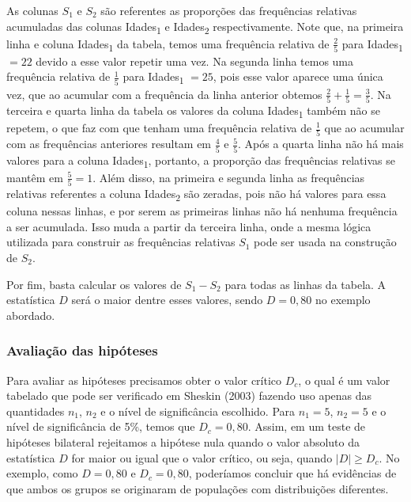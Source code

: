 \documentclass[
  letterpaper,
  DIV=11,
  numbers=noendperiod]{scrreprt}
\begin{document}
As colunas \(S_1\) e \(S_2\) são referentes as proporções das
frequências relativas acumuladas das colunas Idades\textsubscript{1} e
Idades\textsubscript{2} respectivamente. Note que, na primeira linha e
coluna Idades\textsubscript{1} da tabela, temos uma frequência relativa
de \(\displaystyle \frac{2}{5}\) para Idades\textsubscript{1} \(= 22\)
devido a esse valor repetir uma vez. Na segunda linha temos uma
frequência relativa de \(\displaystyle \frac{1}{5}\) para
Idades\textsubscript{1} \(= 25\), pois esse valor aparece uma única vez,
que ao acumular com a frequência da linha anterior obtemos
\(\displaystyle \frac{2}{5} + \displaystyle \frac{1}{5} = \displaystyle \frac{3}{5}\).
Na terceira e quarta linha da tabela os valores da coluna
Idades\textsubscript{1} também não se repetem, o que faz com que tenham
uma frequência relativa de \(\displaystyle \frac{1}{5}\) que ao acumular
com as frequências anteriores resultam em \(\displaystyle \frac{4}{5}\)
e \(\displaystyle \frac{5}{5}\). Após a quarta linha não há mais valores
para a coluna Idades\textsubscript{1}, portanto, a proporção das
frequências relativas se mantêm em \(\displaystyle \frac{5}{5} = 1\).
Além disso, na primeira e segunda linha as frequências relativas
referentes a coluna Idades\textsubscript{2} são zeradas, pois não há
valores para essa coluna nessas linhas, e por serem as primeiras linhas
não há nenhuma frequência a ser acumulada. Isso muda a partir da
terceira linha, onde a mesma lógica utilizada para construir as
frequências relativas \(S_1\) pode ser usada na construção de \(S_2\).

Por fim, basta calcular os valores de \(S_1 - S_2\) para todas as linhas
da tabela. A estatística \(D\) será o maior dentre esses valores, sendo
\(D = 0,80\) no exemplo abordado.

\hypertarget{avaliauxe7uxe3o-das-hipuxf3teses-1}{%
\subsubsection{Avaliação das
hipóteses}\label{avaliauxe7uxe3o-das-hipuxf3teses-1}}

Para avaliar as hipóteses precisamos obter o valor crítico \(D_c\), o
qual é um valor tabelado que pode ser verificado em Sheskin (2003)
fazendo uso apenas das quantidades \(n_1\), \(n_2\) e o nível de
significância escolhido. Para \(n_1 = 5\), \(n_2 = 5\) e o nível de
significância de 5\%, temos que \(D_c = 0,80\). Assim, em um teste de
hipóteses bilateral rejeitamos a hipótese nula quando o valor absoluto
da estatística \(D\) for maior ou igual que o valor crítico, ou seja,
quando \(|D| \geq D_c\). No exemplo, como \(D = 0,80\) e \(D_c = 0,80\),
poderíamos concluir que há evidências de que ambos os grupos se
originaram de populações com distribuições diferentes.
\end{document}
